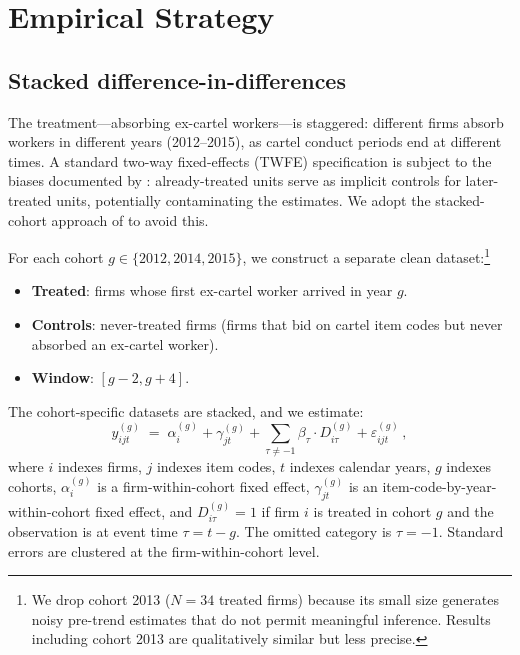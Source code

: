 \section{Empirical Strategy}\label{sec:strategy}

\subsection{Stacked difference-in-differences}

The treatment---absorbing ex-cartel workers---is staggered: different firms absorb workers in different years (2012--2015), as cartel conduct periods end at different times. A standard two-way fixed-effects (TWFE) specification is subject to the biases documented by \citet{goodman2021difference}: already-treated units serve as implicit controls for later-treated units, potentially contaminating the estimates. We adopt the stacked-cohort approach of \citet{cengiz2019effect} to avoid this.

For each cohort $g \in \{2012, 2014, 2015\}$, we construct a separate clean dataset:\footnote{We drop cohort 2013 ($N = 34$ treated firms) because its small size generates noisy pre-trend estimates that do not permit meaningful inference. Results including cohort 2013 are qualitatively similar but less precise.}

\begin{itemize}
\item \textbf{Treated}: firms whose first ex-cartel worker arrived in year $g$.
\item \textbf{Controls}: never-treated firms (firms that bid on cartel item codes but never absorbed an ex-cartel worker).
\item \textbf{Window}: $[g - 2, g + 4]$.
\end{itemize}

The cohort-specific datasets are stacked, and we estimate:
\begin{equation}\label{eq:stacked}
y_{ijt}^{(g)} \;=\; \alpha_i^{(g)} + \gamma_{jt}^{(g)} + \sum_{\tau \neq -1} \beta_\tau \cdot D_{i\tau}^{(g)} + \varepsilon_{ijt}^{(g)}\,,
\end{equation}
where $i$ indexes firms, $j$ indexes item codes, $t$ indexes calendar years, $g$ indexes cohorts, $\alpha_i^{(g)}$ is a firm-within-cohort fixed effect, $\gamma_{jt}^{(g)}$ is an item-code-by-year-within-cohort fixed effect, and $D_{i\tau}^{(g)} = 1$ if firm $i$ is treated in cohort $g$ and the observation is at event time $\tau = t - g$. The omitted category is $\tau = -1$. Standard errors are clustered at the firm-within-cohort level.

